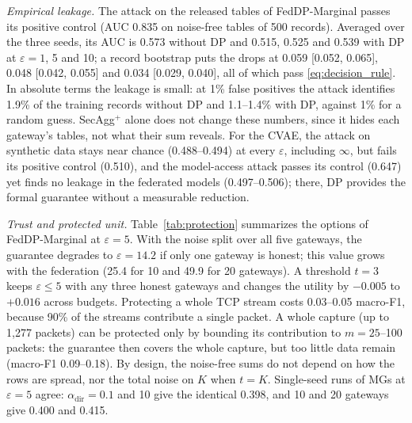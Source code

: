 \documentclass[conference]{IEEEtran}
\begin{document}
\textit{Empirical leakage.} The attack on the released tables of FedDP-Marginal passes its positive control (AUC 0.835 on noise-free tables of 500 records). Averaged over the three seeds, its AUC is 0.573 without DP and 0.515, 0.525 and 0.539 with DP at $\varepsilon = 1$, 5 and 10; a record bootstrap puts the drops at 0.059 [0.052, 0.065], 0.048 [0.042, 0.055] and 0.034 [0.029, 0.040], all of which pass \eqref{eq:decision_rule}. In absolute terms the leakage is small: at 1\% false positives the attack identifies 1.9\% of the training records without DP and 1.1--1.4\% with DP, against 1\% for a random guess. SecAgg$^+$ alone does not change these numbers, since it hides each gateway's tables, not what their sum reveals. For the CVAE, the attack on synthetic data stays near chance (0.488--0.494) at every $\varepsilon$, including $\infty$, but fails its positive control (0.510), and the model-access attack passes its control (0.647) yet finds no leakage in the federated models (0.497--0.506); there, DP provides the formal guarantee without a measurable reduction.

\textit{Trust and protected unit.} Table~\ref{tab:protection} summarizes the options of FedDP-Marginal at $\varepsilon = 5$. With the noise split over all five gateways, the guarantee degrades to $\varepsilon = 14.2$ if only one gateway is honest; this value grows with the federation (25.4 for 10 and 49.9 for 20 gateways). A threshold $t = 3$ keeps $\varepsilon \le 5$ with any three honest gateways and changes the utility by $-0.005$ to $+0.016$ across budgets. Protecting a whole TCP stream costs 0.03--0.05 macro-F1, because 90\% of the streams contribute a single packet. A whole capture (up to 1,277 packets) can be protected only by bounding its contribution to $m = 25$--100 packets: the guarantee then covers the whole capture, but too little data remain (macro-F1 0.09--0.18). By design, the noise-free sums do not depend on how the rows are spread, nor the total noise on $K$ when $t = K$. Single-seed runs of MGs at $\varepsilon = 5$ agree: $\alpha_{\mathrm{dir}} = 0.1$ and 10 give the identical 0.398, and 10 and 20 gateways give 0.400 and 0.415.
\end{document}
